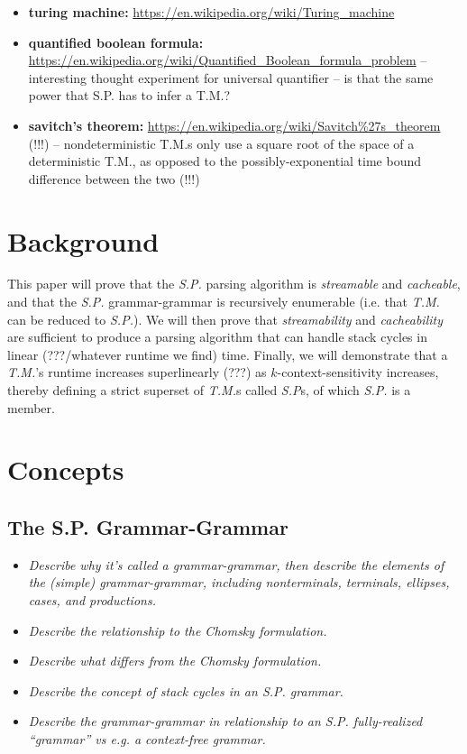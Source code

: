 \documentclass{article}
\begin{document}
\begin{itemize}
  \item \textbf{turing machine:} \url{https://en.wikipedia.org/wiki/Turing\_machine}
  \item \textbf{quantified boolean formula:} \url{https://en.wikipedia.org/wiki/Quantified\_Boolean\_formula\_problem} -- interesting thought experiment for universal quantifier -- is that the same power that S.P. has to infer a T.M.?
  \item \textbf{savitch's theorem:} \url{https://en.wikipedia.org/wiki/Savitch\%27s\_theorem} (!!!) -- nondeterministic T.M.s only use a square root of the space of a deterministic T.M., as opposed to the possibly-exponential time bound difference between the two (!!!)
\end{itemize}

\section{Background}
This paper will prove that the \textit{S.P.} parsing algorithm is \textit{streamable} and \textit{cacheable}, and that the \textit{S.P.} grammar-grammar is recursively enumerable (i.e. that \textit{T.M.} can be reduced to \textit{S.P.}). We will then prove that \textit{streamability} and \textit{cacheability} are sufficient to produce a parsing algorithm that can handle stack cycles in linear (???/whatever runtime we find) time. Finally, we will demonstrate that a \textit{T.M.}'s runtime increases superlinearly (???) as $k$-context-sensitivity increases, thereby defining a strict superset of \textit{T.M.}s called \textit{S.P}s, of which \textit{S.P.} is a member.

\section{Concepts}
\subsection{The S.P. Grammar-Grammar}
\begin{itemize}
  \item \textit{Describe why it's called a grammar-grammar, then describe the elements of the (simple) grammar-grammar, including nonterminals, terminals, ellipses, cases, and productions.}
  \item \textit{Describe the relationship to the Chomsky formulation.}
  \item \textit{Describe what differs from the Chomsky formulation.}
  \item \textit{Describe the concept of stack cycles in an S.P. grammar.}
  \item \textit{Describe the grammar-grammar in relationship to an S.P. fully-realized ``grammar'' vs e.g. a context-free grammar.}
\end{itemize}
\end{document}
